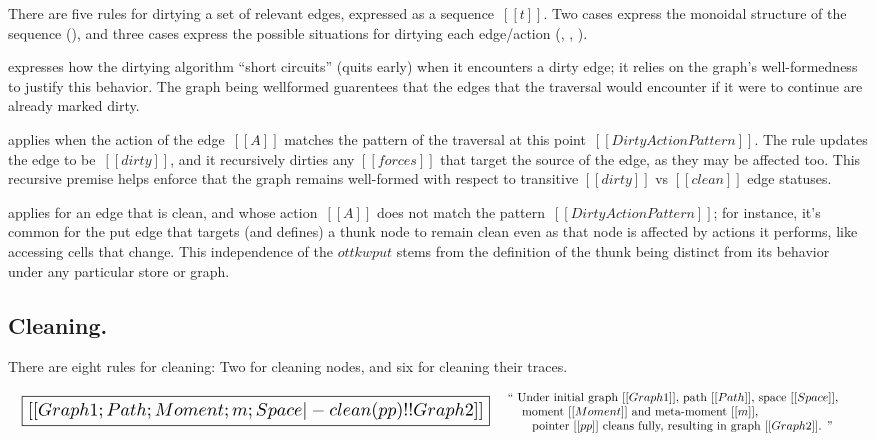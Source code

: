 \documentclass[11pt]{article}
\begin{document}
\begin{mathpar}
\end{mathpar}

There are five rules for dirtying a set of relevant edges, expressed as a sequence~$[[t]]$.
%
Two cases express the monoidal structure of the
sequence (), and
three cases express the possible situations for dirtying each edge/action
(, ,
).

 expresses how the dirtying algorithm ``short
circuits'' (quits early) when it encounters a dirty edge; it relies on
the graph's well-formedness to justify this behavior.
%
The graph being wellformed guarentees that the edges that the traversal
would encounter if it were to continue are already marked dirty.

 applies when the action of the edge~$[[A]]$
matches the pattern of the traversal at this
point~$[[DirtyActionPattern]]$.
%
The rule updates the edge to be~$[[dirty]]$, and it recursively
dirties any $[[forces]]$ that target the source of the edge, as they
may be affected too.
%
This recursive premise helps enforce that the graph remains
well-formed with respect to transitive $[[dirty]]$ vs $[[clean]]$ edge statuses.

 applies for an edge that is clean, and whose
action~$[[A]]$ does not match the pattern~$[[DirtyActionPattern]]$;
for instance, it's common for the put edge that targets (and defines)
a thunk node to remain clean even as that node is affected by actions
it performs, like accessing cells that change.
%
This independence of the $ottkw{put}$ stems from the definition of the
thunk being distinct from its behavior under any particular store or
graph.

\subsection{Cleaning.}

There are eight rules for cleaning: Two for cleaning nodes, and six for cleaning their traces.

\[
\begin{array}{lc}
  {\scalebox{1.5}{
  \boxed{[[Graph1; Path; Moment; m; Space |- clean(pp) !! Graph2]]}}}
&
\begin{array}{p{4in}}
  ``
  Under initial graph~$[[Graph1]]$,
  path~$[[Path]]$,
  space~$[[Space]]$,\\
  \hspace{3mm}~moment~$[[Moment]]$ and meta-moment~$[[m]]$,\\
  \hspace{6mm}~pointer~$[[pp]]$ cleans fully,
  resulting in graph~$[[Graph2]]$.
  ''
\end{array}
\end{array}
\]
\end{document}
